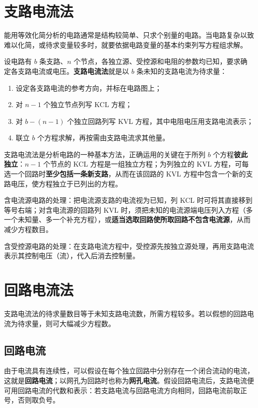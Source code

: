 \section{支路电流法}
能用等效化简分析的电路通常是结构较简单、只求个别量的电路。当电路复杂以致难以化简，或待求变量较多时，就要依据电路变量的基本约束列写方程组求解。

设电路有 $b$ 条支路、$n$ 个节点，各独立源、受控源和电阻的参数均已知，要求确定各支路电流或电压。\textbf{支路电流法}就是以 $b$ 条未知的支路电流为待求量：

\begin{enumerate}
  \item 设定各支路电流的参考方向，并标在电路图上；
  \item 对 $n-1$ 个独立节点列写 KCL 方程；
  \item 对 $b-(n-1)$ 个独立回路列写 KVL 方程，其中电阻电压用支路电流表示；
  \item 联立 $b$ 个方程求解，再按需由支路电流求其他量。
\end{enumerate}

支路电流法是分析电路的一种基本方法，正确运用的关键在于所列 $b$ 个方程\textbf{彼此独立}：$n-1$ 个节点的 KCL 方程是一组独立方程；为列独立的 KVL 方程，可每选一个回路时\textbf{至少包括一条新支路}，从而在该回路的 KVL 方程中包含一个新的支路电压，使方程独立于已列出的方程。

含电流源电路的处理：把电流源支路的电流视为已知，列 KCL 时可将其直接移到等号右端；对含电流源的回路列 KVL 时，须把未知的电流源端电压列入方程（多一个未知量、多一个补充方程），或\textbf{适当选取回路使所取回路不包含电流源}，从而减少方程数目。

含受控源电路的处理：在支路电流方程中，受控源先按独立源处理，再用支路电流表示其控制电压（流），代入后消去控制量。


\section{回路电流法}
支路电流法的待求量数目等于未知支路电流数，所需方程较多。若以假想的回路电流为待求量，则可大幅减少方程数。

\subsection{回路电流}
由于电流具有连续性，可以假设在每个独立回路中分别存在一个闭合流动的电流，这就是\textbf{回路电流}；以网孔为回路时也称为\textbf{网孔电流}。假设回路电流后，支路电流便可用回路电流的代数和表示：若支路电流与回路电流方向相同，回路电流前取正号，否则取负号。

